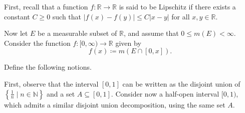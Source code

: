 \documentclass{exam}
\begin{document}
\centering
{}
\vspace{1em}

\begin{questions}
    \question[12]
        First, recall that a function $f: \mathbb{R} \to \mathbb{R}$ is said to be Lipschitz 
        if there exists a constant $C\geq 0$ such that $|f(x)-f(y)| \leq C|x-y|$ 
        for all $x,y \in\mathbb{R}$.

        Now let $E$ be a measurable subset of $\mathbb{R}$, and assume that $0\leq m(E) < \infty$. 
        Consider the function $f:[0, \infty) \to \mathbb{R}$ given by
        \[f(x) \coloneq m(E\cap [0,x]).\]


    \question[12]
        Define the following notions.
    \question[12]
        First, observe that the interval $[0,1]$ can be written as the disjoint union of $\left\{\frac{1}{n}\mid n\in\mathbb{N}\right\}$ 
        and a set $A\subseteq [0,1]$. Consider now a half-open interval $[0,1)$, which admits a similar 
        disjoint union decomposition, using the same set $A$.
        \begin{parts}

\end{parts}
\end{questions}
\end{document}
